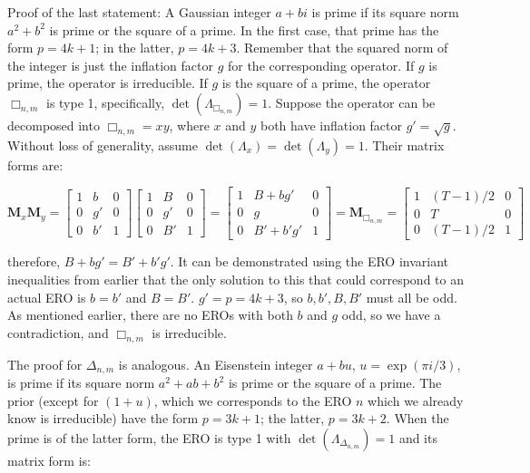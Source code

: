 \documentclass{amsart}[12pt]
\begin{document}
Proof of the last statement: A Gaussian integer $a + bi$ is prime if its
square norm $a^2 + b^2$ is prime or the square of a prime. In the first
case, that prime has the form $p=4k+1$; in the latter, $p=4k+3$.
Remember that the squared norm of the integer is just the inflation factor $g$
for the corresponding operator. If $g$ is prime, the operator is irreducible.
If $g$ is the square of a prime, the operator $\Box_{n,m}$ is type 1,
specifically, $\det(\Lambda_{\Box_{n,m}}) = 1$. Suppose the operator can
be decomposed into $\Box_{n,m} = xy$, where $x$ and $y$ both have
inflation factor $g' = \sqrt{g}$. Without loss of generality, assume
$\det(\Lambda_x) = \det(\Lambda_y) = 1$. Their matrix forms are:

\begin{equation}
   \mathbf{M}_x \mathbf{M}_y = \begin{bmatrix}
   1 & b & 0 \\
   0 & g' & 0 \\
   0 & b' & 1 \end{bmatrix} \begin{bmatrix}
   1 & B & 0 \\
   0 & g' & 0 \\
   0 & B' & 1 \end{bmatrix}
   = \begin{bmatrix}
   1 & B+bg' & 0 \\
   0 & g & 0 \\
   0 & B'+b'g' & 1 \end{bmatrix}
   = \mathbf{M}_{\Box_{n,m}} = \begin{bmatrix}
   1 & (T-1)/2 & 0 \\
   0 & T & 0 \\
   0 & (T-1)/2 & 1 \end{bmatrix}
\end{equation}

therefore, $B+bg' = B'+b'g'$. It can be demonstrated using the ERO
invariant inequalities from earlier that the only solution to this that could
correspond to an actual ERO is $b=b'$ and $B=B'$.
$g' = p = 4k + 3$, so $b, b', B, B'$ must all be odd. As mentioned
earlier, there are no EROs with both $b$ and $g$ odd, so we have a
contradiction, and $\Box_{n,m}$ is irreducible.

The proof for $\Delta_{n,m}$ is analogous. An Eisenstein integer
$a + bu$, $u=\exp(\pi i/3)$, is prime if its square norm
$a^2 + ab + b^2$ is prime or the square of a prime. The prior (except
for $(1 + u)$, which we corresponds to the ERO $n$ which we already
know is irreducible) have the form $p=3k+1$; the latter, $p=3k+2$.
When the prime is of the latter form, the ERO is type 1 with
$\det(\Lambda_{\Delta_{n,m}}) = 1$ and its matrix form is:
\end{document}
